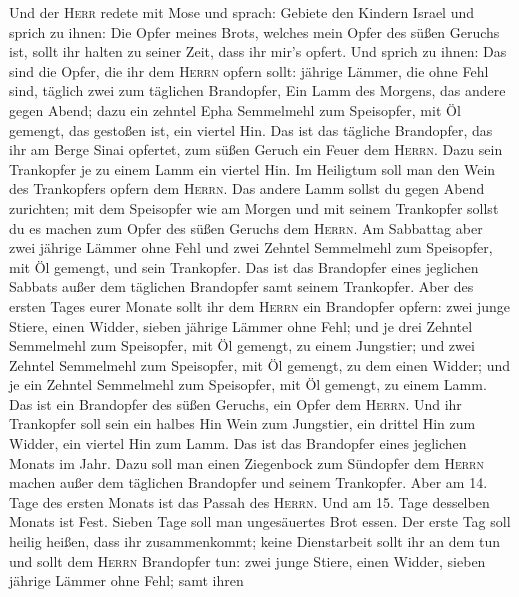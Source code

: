  Und der \textsc{Herr} redete mit Mose und sprach:
 Gebiete den Kindern Israel und sprich zu ihnen: Die Opfer
meines Brots, welches mein Opfer des süßen Geruchs ist, sollt ihr halten
zu seiner Zeit, dass ihr mir's opfert.  Und sprich zu
ihnen: Das sind die Opfer, die ihr dem \textsc{Herrn} opfern sollt:
jährige Lämmer, die ohne Fehl sind, täglich zwei zum täglichen
Brandopfer,  Ein Lamm des Morgens, das andere gegen Abend;
 dazu ein zehntel Epha Semmelmehl zum Speisopfer, mit Öl
gemengt, das gestoßen ist, ein viertel Hin.  Das ist das
tägliche Brandopfer, das ihr am Berge Sinai opfertet, zum süßen Geruch
ein Feuer dem \textsc{Herrn}.  Dazu sein Trankopfer je zu
einem Lamm ein viertel Hin. Im Heiligtum soll man den Wein des
Trankopfers opfern dem \textsc{Herrn}.  Das andere Lamm
sollst du gegen Abend zurichten; mit dem Speisopfer wie am Morgen und
mit seinem Trankopfer sollst du es machen zum Opfer des süßen Geruchs
dem \textsc{Herrn}.  Am Sabbattag aber zwei jährige Lämmer
ohne Fehl und zwei Zehntel Semmelmehl zum Speisopfer, mit Öl gemengt,
und sein Trankopfer.  Das ist das Brandopfer eines
jeglichen Sabbats außer dem täglichen Brandopfer samt seinem Trankopfer.
 Aber des ersten Tages eurer Monate sollt ihr dem
\textsc{Herrn} ein Brandopfer opfern: zwei junge Stiere, einen Widder,
sieben jährige Lämmer ohne Fehl;  und je drei Zehntel
Semmelmehl zum Speisopfer, mit Öl gemengt, zu einem Jungstier; und zwei
Zehntel Semmelmehl zum Speisopfer, mit Öl gemengt, zu dem einen Widder;
 und je ein Zehntel Semmelmehl zum Speisopfer, mit Öl
gemengt, zu einem Lamm. Das ist ein Brandopfer des süßen Geruchs, ein
Opfer dem \textsc{Herrn}.  Und ihr Trankopfer soll sein
ein halbes Hin Wein zum Jungstier, ein drittel Hin zum Widder, ein
viertel Hin zum Lamm. Das ist das Brandopfer eines jeglichen Monats im
Jahr.  Dazu soll man einen Ziegenbock zum Sündopfer dem
\textsc{Herrn} machen außer dem täglichen Brandopfer und seinem
Trankopfer.  Aber am 14. Tage des ersten Monats ist das
Passah des \textsc{Herrn}.  Und am 15. Tage desselben
Monats ist Fest. Sieben Tage soll man ungesäuertes Brot essen.
 Der erste Tag soll heilig heißen, dass ihr
zusammenkommt; keine Dienstarbeit sollt ihr an dem tun 
und sollt dem \textsc{Herrn} Brandopfer tun: zwei junge Stiere, einen
Widder, sieben jährige Lämmer ohne Fehl;  samt ihren
